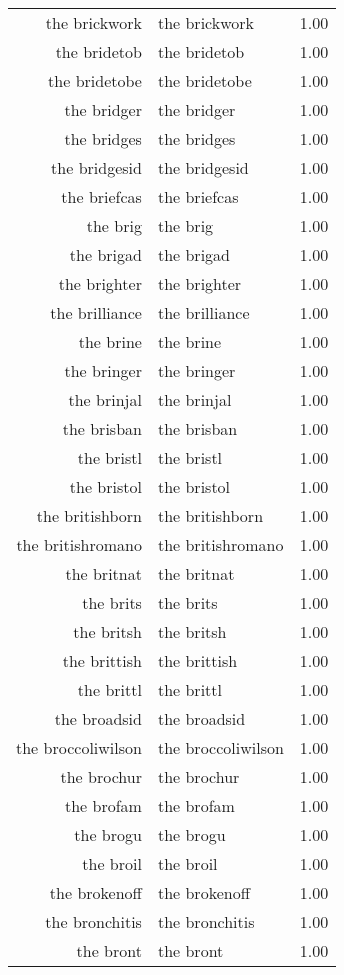 \begin{table}[ht]
\begin{tabular}{rlr}
  the brickwork & the brickwork & 1.00 \\ 
  the bridetob & the bridetob & 1.00 \\ 
  the bridetobe & the bridetobe & 1.00 \\ 
  the bridger & the bridger & 1.00 \\ 
  the bridges & the bridges & 1.00 \\ 
  the bridgesid & the bridgesid & 1.00 \\ 
  the briefcas & the briefcas & 1.00 \\ 
  the brig & the brig & 1.00 \\ 
  the brigad & the brigad & 1.00 \\ 
  the brighter & the brighter & 1.00 \\ 
  the brilliance & the brilliance & 1.00 \\ 
  the brine & the brine & 1.00 \\ 
  the bringer & the bringer & 1.00 \\ 
  the brinjal & the brinjal & 1.00 \\ 
  the brisban & the brisban & 1.00 \\ 
  the bristl & the bristl & 1.00 \\ 
  the bristol & the bristol & 1.00 \\ 
  the britishborn & the britishborn & 1.00 \\ 
  the britishromano & the britishromano & 1.00 \\ 
  the britnat & the britnat & 1.00 \\ 
  the brits & the brits & 1.00 \\ 
  the britsh & the britsh & 1.00 \\ 
  the brittish & the brittish & 1.00 \\ 
  the brittl & the brittl & 1.00 \\ 
  the broadsid & the broadsid & 1.00 \\ 
  the broccoliwilson & the broccoliwilson & 1.00 \\ 
  the brochur & the brochur & 1.00 \\ 
  the brofam & the brofam & 1.00 \\ 
  the brogu & the brogu & 1.00 \\ 
  the broil & the broil & 1.00 \\ 
  the brokenoff & the brokenoff & 1.00 \\ 
  the bronchitis & the bronchitis & 1.00 \\ 
  the bront & the bront & 1.00 \\ 

\end{tabular}
\end{table}
